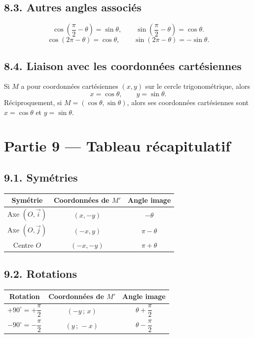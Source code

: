 \documentclass[11pt,a4paper]{article}
\begin{document}
\subsection*{8.3. Autres angles associés}

\[
\cos\left(\dfrac{\pi}{2}-\theta\right)=\sin\theta,\qquad
\sin\left(\dfrac{\pi}{2}-\theta\right)=\cos\theta.
\]
\[
\cos(2\pi-\theta)=\cos\theta,\qquad
\sin(2\pi-\theta)=-\sin\theta.
\]

\subsection*{8.4. Liaison avec les coordonnées cartésiennes}

Si $M$ a pour coordonnées cartésiennes $(x,y)$ sur le cercle trigonométrique, alors
\[
x=\cos\theta,\qquad y=\sin\theta.
\]
Réciproquement, si $M=(\cos\theta,\sin\theta)$, alors ses coordonnées cartésiennes sont $x=\cos\theta$ et $y=\sin\theta$.

\clearpage
\section*{Partie 9 — Tableau récapitulatif}

\subsection*{9.1. Symétries}

\begin{center}
\begin{tabular}{|c|c|c|}
\hline
\textbf{Symétrie} & \textbf{Coordonnées de $M'$} & \textbf{Angle image} \\
\hline
Axe $(O,\vec{i})$ & $(x,-y)$ & $-\theta$ \\
\hline
Axe $(O,\vec{j})$ & $(-x,y)$ & $\pi-\theta$ \\
\hline
Centre $O$ & $(-x,-y)$ & $\pi+\theta$ \\
\hline
\end{tabular}
\end{center}

\subsection*{9.2. Rotations}

\begin{center}
\begin{tabular}{|c|c|c|}
\hline
\textbf{Rotation} & \textbf{Coordonnées de $M'$} & \textbf{Angle image} \\
\hline
$+90^\circ=+\dfrac{\pi}{2}$ & $(-y\,;\,x)$ & $\theta+\dfrac{\pi}{2}$ \\
\hline
$-90^\circ=-\dfrac{\pi}{2}$ & $(y\,;\,-x)$ & $\theta-\dfrac{\pi}{2}$ \\
\hline
\end{tabular}
\end{center}
\end{document}

